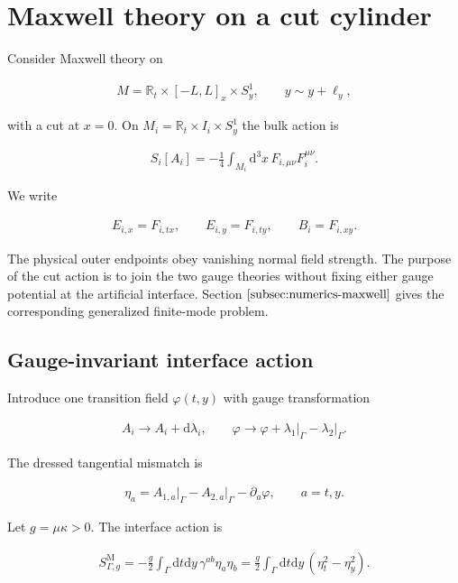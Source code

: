 \section{Maxwell theory on a cut cylinder}\label{sec:maxwell}

Consider Maxwell theory on

\begin{align}
M=\mathbb R_t\times[-L,L]_x\times S_y^1,
\qquad
y\sim y+\ell_y,
\end{align}

with a cut at $x=0$. On $M_i=\mathbb R_t\times I_i\times S_y^1$ the bulk action is

\begin{align}
S_i[A_i]=-\frac14\int_{M_i}\mathrm d^3x\,
F_{i,\mu\nu}F_i^{\mu\nu}.
\end{align}

We write

\begin{align}
E_{i,x}=F_{i,tx},
\qquad
E_{i,y}=F_{i,ty},
\qquad
B_i=F_{i,xy}.
\end{align}

The physical outer endpoints obey vanishing normal field strength. The purpose of the cut action is to join the two gauge theories without fixing either gauge potential at the artificial interface. Section $\ref{subsec:numerics-maxwell}$ gives the corresponding generalized finite-mode problem.

\subsection{Gauge-invariant interface action}\label{subsec:maxwell-interface}

Introduce one transition field $\varphi(t,y)$ with gauge transformation

\begin{align}
A_i\longrightarrow A_i+\mathrm d\lambda_i,
\qquad
\varphi\longrightarrow
\varphi+\lambda_1\big|_\Gamma-\lambda_2\big|_\Gamma.
\end{align}

The dressed tangential mismatch is

\begin{align}
\eta_a
=A_{1,a}\big|_\Gamma-A_{2,a}\big|_\Gamma-\partial_a\varphi,
\qquad
a=t,y.
\end{align}

Let $g=\mu\kappa>0$. The interface action is

\begin{align}
S_{\Gamma,g}^{\mathrm M}
=-\frac g2\int_\Gamma\mathrm dt\mathrm dy\,
\gamma^{ab}\eta_a\eta_b
=\frac g2\int_\Gamma\mathrm dt\mathrm dy\,
(\eta_t^2-\eta_y^2).
\end{align}

